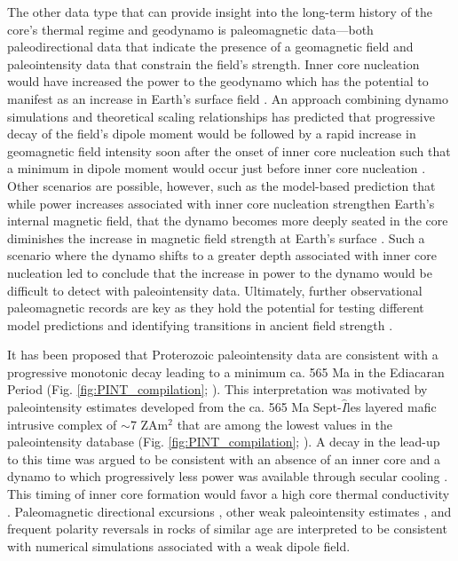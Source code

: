 The other data type that can provide insight into the long-term history of the core's thermal regime and geodynamo is paleomagnetic data---both paleodirectional data that indicate the presence of a geomagnetic field and paleointensity data that constrain the field's strength. Inner core nucleation would have increased the power to the geodynamo which has the potential to manifest as an increase in Earth's surface field \citep{Davies2021a}. An approach combining dynamo simulations and theoretical scaling relationships has predicted that progressive decay of the field's dipole moment would be followed by a rapid increase in geomagnetic field intensity soon after the onset of inner core nucleation such that a minimum in dipole moment would occur just before inner core nucleation \citep{Davies2021a}. Other scenarios are possible, however, such as the model-based prediction that while power increases associated with inner core nucleation strengthen Earth's internal magnetic field, that the dynamo becomes more deeply seated in the core diminishes the increase in magnetic field strength at Earth's surface \citep{Aubert2009a, Landeau2017a}. Such a scenario where the dynamo shifts to a greater depth associated with inner core nucleation led \citealp{Aubert2009a} to conclude that the increase in power to the dynamo would be difficult to detect with paleointensity data. Ultimately, further observational paleomagnetic records are key as they hold the potential for testing different model predictions and identifying transitions in ancient field strength \citep{Biggin2015a, Bono2019a}.

It has been proposed that Proterozoic paleointensity data are consistent with a progressive monotonic decay leading to a minimum ca. 565 Ma in the Ediacaran Period (Fig. \ref{fig:PINT_compilation}; \citealp{Bono2019a}). This interpretation was motivated by paleointensity estimates developed from the ca. 565 Ma Sept-$\hat{I}$les layered mafic intrusive complex of $\sim$7 ZAm$^2$ that are among the lowest values in the paleointensity database (Fig. \ref{fig:PINT_compilation}; \citealp{Bono2019a}). A decay in the lead-up to this time was argued to be consistent with an absence of an inner core and a dynamo to which progressively less power was available through secular cooling \citep{Bono2019a, Davies2021a}. This timing of inner core formation would favor a high core thermal conductivity \cite[e.g.][]{Ohta2016a}. Paleomagnetic directional excursions \citep{Halls2015a}, other weak paleointensity estimates \citep{Thallner2021b}, and frequent polarity reversals \citep{Kodama2021a} in rocks of similar age are interpreted to be consistent with numerical simulations \citep{Driscoll2016a} associated with a weak dipole field. 

